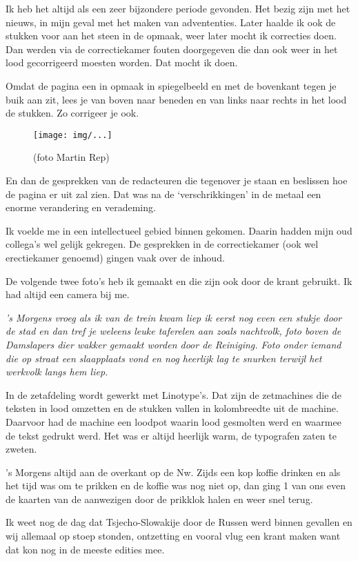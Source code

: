 \documentclass[10pt,twoside,openright]{memoir}
\begin{document}
Ik heb het altijd als een zeer bijzondere periode gevonden. Het bezig zijn met het nieuws, in mijn geval met het maken van advententies. Later haalde ik ook de stukken voor aan het steen in de opmaak, weer later mocht ik correcties doen. Dan werden via de correctiekamer fouten doorgegeven die dan ook weer in het lood gecorrigeerd moesten worden. Dat mocht ik doen. 

Omdat de pagina een in opmaak in spiegelbeeld en met de bovenkant tegen je buik aan zit, lees je van boven naar beneden en van links naar rechts in het lood de stukken. Zo corrigeer je ook. 

\begin{figure}[t]
\texttt{[image: img/...]}
\caption{(foto Martin Rep)}
\end{figure}

En dan de gesprekken van de redacteuren die tegenover je staan en beslissen hoe de pagina er uit zal zien. Dat was na de `verschrikkingen' in de metaal een enorme verandering en verademing.

Ik voelde me in een intellectueel gebied binnen gekomen. Daarin hadden mijn oud collega’s wel gelijk gekregen. De gesprekken in de correctiekamer (ook wel erectiekamer genoemd) gingen vaak over de inhoud. 

De volgende twee foto’s heb ik gemaakt en die zijn ook door de krant gebruikt. Ik had altijd een camera bij me.

\emph{’s Morgens vroeg als ik van de trein kwam liep ik eerst nog even een stukje door de stad en dan tref je weleens leuke taferelen aan zoals nachtvolk, foto boven de Damslapers dier wakker gemaakt worden door de Reiniging. Foto onder iemand die op straat een slaapplaats vond en nog heerlijk lag te snurken terwijl het werkvolk langs hem liep.}

In de zetafdeling wordt gewerkt met Linotype's. Dat zijn de zetmachines die de teksten in lood omzetten en de stukken vallen in kolombreedte uit de machine. Daarvoor had de machine een loodpot waarin lood gesmolten werd en waarmee de tekst gedrukt werd. Het was er altijd heerlijk warm, de typografen zaten te zweten.

's Morgens altijd aan de overkant op de Nw. Zijds een kop koffie drinken en als het tijd was om te prikken en de koffie was nog niet op, dan ging 1 van ons even de kaarten van de aanwezigen door de prikklok halen en weer snel terug.

Ik weet nog de dag dat Tsjecho-Slowakije door de Russen werd 
binnen gevallen en wij allemaal op stoep stonden, ontzetting en vooral vlug een krant maken want dat kon nog in de meeste edities mee. 
\end{document}
